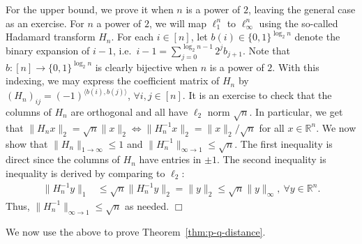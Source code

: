 \documentclass[11pt]{article}
\theoremstyle{plain}
\newenvironment{proof}{\noindent {\sc Proof:}}{$\Box$ \medskip}
\theoremstyle{plain}
\newcommand{\set}[1]{\{{#1}\}}
\newcommand{\R}{\ensuremath{\mathbb{R}}}
\newcommand{\pr}[2]{\langle{#1, #2}\rangle}
\begin{document}
\begin{proof}
For the upper bound, we prove it when $n$ is a power of $2$, leaving the general
case as an exercise. For $n$ a power of $2$, we will map $\ell_1^n$ to
$\ell_\infty^n$ using the so-called Hadamard transform $H_n$. For each $i \in
[n]$, let $b(i) \in \set{0,1}^{\log_2 n}$ denote the binary expansion of $i-1$,
i.e.~$i-1 = \sum_{j=0}^{\log_2 n-1} 2^{j} b_{j+1}$. Note that $b:[n] \rightarrow
\set{0,1}^{\log_2 n}$ is clearly bijective when $n$ is a power of $2$. With
this indexing, we may express the coefficient matrix of $H_n$ by $(H_n)_{ij} =
(-1)^{\pr{b(i)}{b(j)}}$, $\forall i,j \in [n]$. It is an exercise to check that
the columns of $H_n$ are orthogonal and all have $\ell_2$ norm $\sqrt{n}$. In
particular, we get that $\|H_n x\|_2 = \sqrt{n} \|x\|_2 \Leftrightarrow
\|H_n^{-1}x\|_2 = \|x\|_2/\sqrt{n}$ for all $x \in \R^n$. 
We now show that $\|H_n\|_{1 \rightarrow \infty} \leq 1$ and
$\|H_n^{-1}\|_{\infty \rightarrow 1} \leq \sqrt{n}$. The first inequality is
direct since the columns of $H_n$ have entries in $\pm 1$. The second inequality
is inequality is derived by comparing to $\ell_2$:
\begin{align*}
\|H_n^{-1}y\|_1 &\leq \sqrt{n}\|H_n^{-1}y\|_2 
                = \|y\|_2 \leq \sqrt{n} \|y\|_\infty, ~\forall y \in \R^n.
\end{align*}
Thus, $\|H_n^{-1}\|_{\infty \rightarrow 1} \leq \sqrt{n}$ as needed. 
\end{proof}

We now use the above to prove Theorem~\ref{thm:p-q-distance}.
\end{document}

